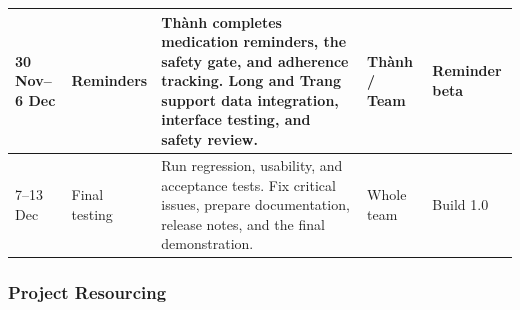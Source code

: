 \begin{longtable}{|L{0.14\textwidth}|L{0.16\textwidth}|L{0.34\textwidth}|L{0.14\textwidth}|L{0.10\textwidth}|}
30 Nov--6 Dec
& Reminders
& Thành completes medication reminders,
the safety gate, and adherence tracking.
Long and Trang support data integration,
interface testing, and safety review.
& Thành / Team
& Reminder beta
\\ \hline

7--13 Dec
& Final testing
& Run regression, usability, and acceptance tests.
Fix critical issues, prepare documentation,
release notes, and the final demonstration.
& Whole team
& Build 1.0
\\ \hline

\end{longtable}

%


\subsubsection{Project Resourcing}


